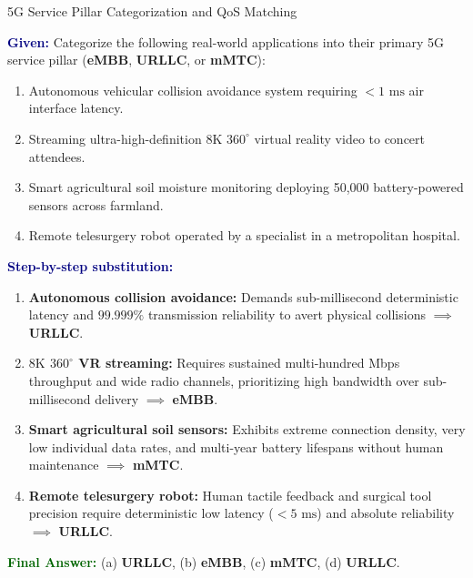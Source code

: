\documentclass[11pt,a4paper,openany]{report}
\newcommand{\Given}{\par\textbf{\textcolor{navy}{Given:}} }
\newcommand{\Steps}{\par\textbf{\textcolor{navy}{Step-by-step substitution:}}\par}
\newcommand{\Answer}{\par\textbf{\textcolor{darkgreen}{Final Answer:}} }
\begin{document}
\begin{solved}{5G Service Pillar Categorization and QoS Matching}
\Given Categorize the following real-world applications into their primary 5G service pillar (\textbf{eMBB}, \textbf{URLLC}, or \textbf{mMTC}):
\begin{enumerate}[label=(\alph*),leftmargin=*]
  \item Autonomous vehicular collision avoidance system requiring $< 1\text{ ms}$ air interface latency.
  \item Streaming ultra-high-definition $8\text{K}$ $360^\circ$ virtual reality video to concert attendees.
  \item Smart agricultural soil moisture monitoring deploying 50,000 battery-powered sensors across farmland.
  \item Remote telesurgery robot operated by a specialist in a metropolitan hospital.
\end{enumerate}
\Steps
\begin{enumerate}[leftmargin=*]
  \item \textbf{Autonomous collision avoidance:} Demands sub-millisecond deterministic latency and $99.999\%$ transmission reliability to avert physical collisions $\implies$ \textbf{URLLC}.
  \item \textbf{$8\text{K}$ $360^\circ$ VR streaming:} Requires sustained multi-hundred Mbps throughput and wide radio channels, prioritizing high bandwidth over sub-millisecond delivery $\implies$ \textbf{eMBB}.
  \item \textbf{Smart agricultural soil sensors:} Exhibits extreme connection density, very low individual data rates, and multi-year battery lifespans without human maintenance $\implies$ \textbf{mMTC}.
  \item \textbf{Remote telesurgery robot:} Human tactile feedback and surgical tool precision require deterministic low latency ($< 5\text{ ms}$) and absolute reliability $\implies$ \textbf{URLLC}.
\end{enumerate}
\Answer (a) \textbf{URLLC}, (b) \textbf{eMBB}, (c) \textbf{mMTC}, (d) \textbf{URLLC}.
\end{solved}
\end{document}
